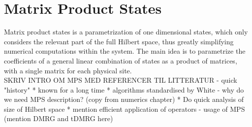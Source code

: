 \chapter{Matrix Product States}
Matrix product states is a parametrization of one dimensional states, which only considers the relevant part of the full Hilbert space, thus greatly simplifying numerical computations within the system. The main idea is to parametrize the coefficients of a general linear combination of states as a product of matrices, with a single matrix for each physical site.\\
SKRIV INTRO OM MPS MED REFERENCER TIL LITTERATUR 
- quick "history"
   * known for a long time
   * algorithms standardised by White
- why do we need MPS description? (copy from numerics chapter)
   * Do quick analysis of size of Hilbert space
   * mention efficient application of operators
- usage of MPS (mention DMRG and tDMRG here)


